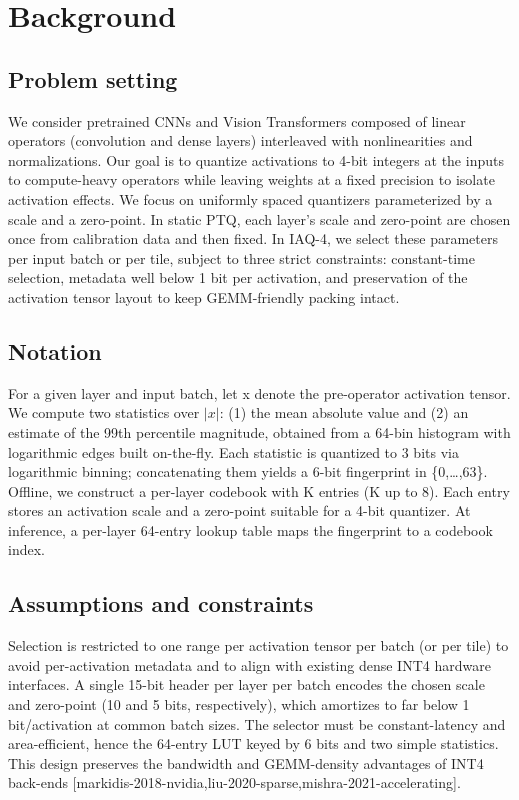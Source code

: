 \documentclass{article}
\begin{document}
\section{Background}
\subsection{Problem setting}
We consider pretrained CNNs and Vision Transformers composed of linear operators (convolution and dense layers) interleaved with nonlinearities and normalizations. Our goal is to quantize activations to 4-bit integers at the inputs to compute-heavy operators while leaving weights at a fixed precision to isolate activation effects. We focus on uniformly spaced quantizers parameterized by a scale and a zero-point. In static PTQ, each layer's scale and zero-point are chosen once from calibration data and then fixed. In IAQ-4, we select these parameters per input batch or per tile, subject to three strict constraints: constant-time selection, metadata well below 1 bit per activation, and preservation of the activation tensor layout to keep GEMM-friendly packing intact.

\subsection{Notation}
For a given layer and input batch, let x denote the pre-operator activation tensor. We compute two statistics over \(|x|\): (1) the mean absolute value and (2) an estimate of the 99th percentile magnitude, obtained from a 64-bin histogram with logarithmic edges built on-the-fly. Each statistic is quantized to 3 bits via logarithmic binning; concatenating them yields a 6-bit fingerprint in \{0,\ldots,63\}. Offline, we construct a per-layer codebook with K entries (K up to 8). Each entry stores an activation scale and a zero-point suitable for a 4-bit quantizer. At inference, a per-layer 64-entry lookup table maps the fingerprint to a codebook index.

\subsection{Assumptions and constraints}
Selection is restricted to one range per activation tensor per batch (or per tile) to avoid per-activation metadata and to align with existing dense INT4 hardware interfaces. A single 15-bit header per layer per batch encodes the chosen scale and zero-point (10 and 5 bits, respectively), which amortizes to far below 1 bit/activation at common batch sizes. The selector must be constant-latency and area-efficient, hence the 64-entry LUT keyed by 6 bits and two simple statistics. This design preserves the bandwidth and GEMM-density advantages of INT4 back-ends [markidis-2018-nvidia,liu-2020-sparse,mishra-2021-accelerating].
\end{document}
